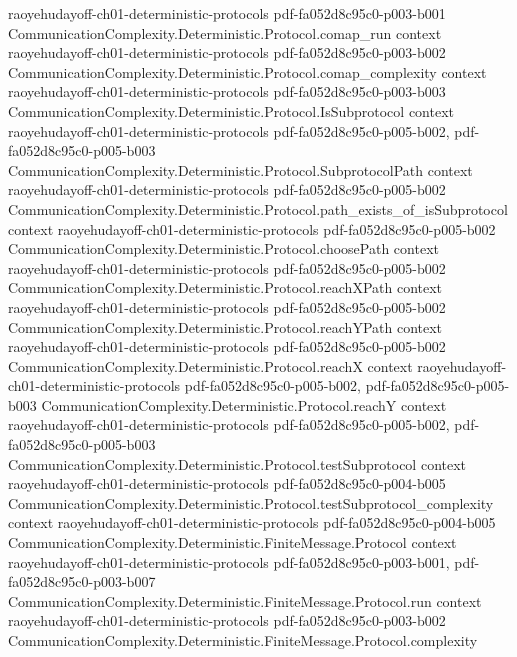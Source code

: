 \begin{lemma}
  {raoyehudayoff-ch01-deterministic-protocols}
  {pdf-fa052d8c95c0-p003-b001}
\proofstep
  {CommunicationComplexity.Deterministic.Protocol.comap_run}
  {context}
  {raoyehudayoff-ch01-deterministic-protocols}
  {pdf-fa052d8c95c0-p003-b002}
\proofstep
  {CommunicationComplexity.Deterministic.Protocol.comap_complexity}
  {context}
  {raoyehudayoff-ch01-deterministic-protocols}
  {pdf-fa052d8c95c0-p003-b003}
\proofstep
  {CommunicationComplexity.Deterministic.Protocol.IsSubprotocol}
  {context}
  {raoyehudayoff-ch01-deterministic-protocols}
  {pdf-fa052d8c95c0-p005-b002,
    pdf-fa052d8c95c0-p005-b003}
\proofstep
  {CommunicationComplexity.Deterministic.Protocol.SubprotocolPath}
  {context}
  {raoyehudayoff-ch01-deterministic-protocols}
  {pdf-fa052d8c95c0-p005-b002}
\proofstep
  {CommunicationComplexity.Deterministic.Protocol.path_exists_of_isSubprotocol}
  {context}
  {raoyehudayoff-ch01-deterministic-protocols}
  {pdf-fa052d8c95c0-p005-b002}
\proofstep
  {CommunicationComplexity.Deterministic.Protocol.choosePath}
  {context}
  {raoyehudayoff-ch01-deterministic-protocols}
  {pdf-fa052d8c95c0-p005-b002}
\proofstep
  {CommunicationComplexity.Deterministic.Protocol.reachXPath}
  {context}
  {raoyehudayoff-ch01-deterministic-protocols}
  {pdf-fa052d8c95c0-p005-b002}
\proofstep
  {CommunicationComplexity.Deterministic.Protocol.reachYPath}
  {context}
  {raoyehudayoff-ch01-deterministic-protocols}
  {pdf-fa052d8c95c0-p005-b002}
\proofstep
  {CommunicationComplexity.Deterministic.Protocol.reachX}
  {context}
  {raoyehudayoff-ch01-deterministic-protocols}
  {pdf-fa052d8c95c0-p005-b002,
    pdf-fa052d8c95c0-p005-b003}
\proofstep
  {CommunicationComplexity.Deterministic.Protocol.reachY}
  {context}
  {raoyehudayoff-ch01-deterministic-protocols}
  {pdf-fa052d8c95c0-p005-b002,
    pdf-fa052d8c95c0-p005-b003}
\proofstep
  {CommunicationComplexity.Deterministic.Protocol.testSubprotocol}
  {context}
  {raoyehudayoff-ch01-deterministic-protocols}
  {pdf-fa052d8c95c0-p004-b005}
\proofstep
  {CommunicationComplexity.Deterministic.Protocol.testSubprotocol_complexity}
  {context}
  {raoyehudayoff-ch01-deterministic-protocols}
  {pdf-fa052d8c95c0-p004-b005}
\proofstep
  {CommunicationComplexity.Deterministic.FiniteMessage.Protocol}
  {context}
  {raoyehudayoff-ch01-deterministic-protocols}
  {pdf-fa052d8c95c0-p003-b001,
    pdf-fa052d8c95c0-p003-b007}
\proofstep
  {CommunicationComplexity.Deterministic.FiniteMessage.Protocol.run}
  {context}
  {raoyehudayoff-ch01-deterministic-protocols}
  {pdf-fa052d8c95c0-p003-b002}
\proofstep
  {CommunicationComplexity.Deterministic.FiniteMessage.Protocol.complexity}

\end{lemma}
